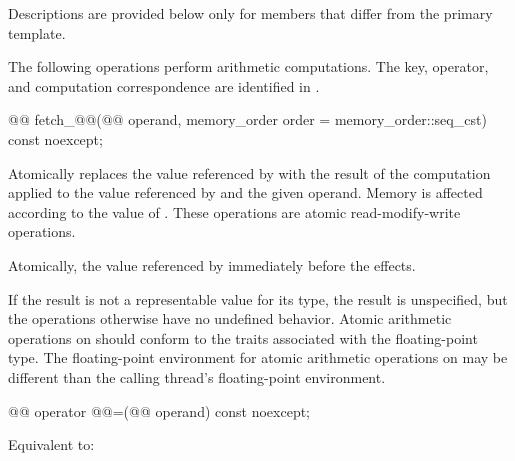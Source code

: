 \pnum
Descriptions are provided below only for members
that differ from the primary template.

\pnum
The following operations perform arithmetic computations.
The key, operator, and computation correspondence are identified
in .

%
%
\begin{itemdecl}
@@ fetch_@@(@@ operand,
                          memory_order order = memory_order::seq_cst) const noexcept;
\end{itemdecl}

\begin{itemdescr}
\pnum
\effects
Atomically replaces the value referenced by  with
the result of the computation applied to the value referenced by 
and the given operand.
Memory is affected according to the value of .
These operations are atomic read-modify-write operations.

\pnum
\returns
Atomically, the value referenced by 
immediately before the effects.

\pnum
\remarks
If the result is not a representable value for its type,
the result is unspecified,
but the operations otherwise have no undefined behavior.
Atomic arithmetic operations on  should conform to
the  traits
associated with the floating-point type.
The floating-point environment
for atomic arithmetic operations on 
may be different than the calling thread's floating-point environment.
\end{itemdescr}

%
%
\begin{itemdecl}
@@ operator @@=(@@ operand) const noexcept;
\end{itemdecl}

\begin{itemdescr}
\pnum
\effects
Equivalent to:
\end{itemdescr}

